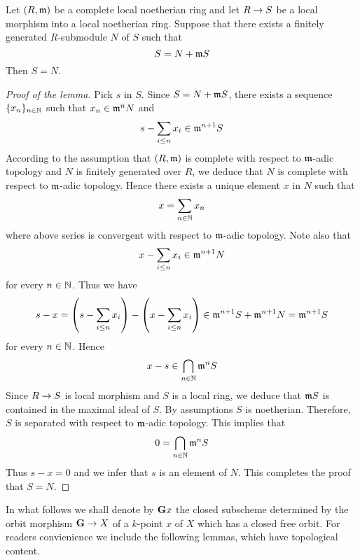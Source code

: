 \begin{lemma}\label{lemma:Hensels_lemma}
Let $(R,\mathfrak{m})$ be a complete local noetherian ring and let $R\rightarrow S$ be a local morphism into a local noetherian ring. Suppose that there exists a finitely generated $R$-submodule $N$ of $S$ such that
$$S = N + \mathfrak{m}S$$
Then $S = N$.
\end{lemma}
\begin{proof}[Proof of the lemma]
Pick $s$ in $S$. Since $S = N + \mathfrak{m}S$, there exists a sequence $\{x_n\}_{n\in {\mathbb N}}$ such that $x_n\in \mathfrak{m}^{n}N$ and 
$$s - \sum_{i\leq n}x_i \in \mathfrak{m}^{n+1}S$$
According to the assumption that $(R,\mathfrak{m})$ is complete with respect to $\mathfrak{m}$-adic topology and $N$ is finitely generated over $R$, we deduce that $N$ is complete with respect to $\mathfrak{m}$-adic topology. Hence there exists a unique element $x$ in $N$ such that
$$x = \sum_{n\in {\mathbb N}}x_n$$
where above series is convergent with respect to $\mathfrak{m}$-adic topology. Note also that
$$x - \sum_{i\leq n}x_i\in \mathfrak{m}^{n+1}N$$
for every $n\in {\mathbb N}$. Thus we have
$$s - x = \left(s - \sum_{i\leq n}x_i\right) - \left(x - \sum_{i\leq n}x_i\right) \in \mathfrak{m}^{n+1}S + \mathfrak{m}^{n+1}N = \mathfrak{m}^{n+1}S$$
for every $n\in {\mathbb N}$. Hence
$$x - s \in \bigcap_{n\in {\mathbb N}}\mathfrak{m}^nS$$
Since $R\rightarrow S$ is local morphism and $S$ is a local ring, we deduce that $\mathfrak{m}S$ is contained in the maximal ideal of $S$. By assumptions $S$ is noetherian. Therefore, $S$ is separated with respect to $\mathfrak{m}$-adic topology. This implies that
$$0 = \bigcap_{n\in {\mathbb N}}\mathfrak{m}^nS$$
Thus $s - x = 0$ and we infer that $s$ is an element of $N$. This completes the proof that $S = N$.
\end{proof}
\noindent
In what follows we shall denote by $\mathbf{G}x$ the closed subscheme determined by the orbit morphism $\mathbf{G}\rightarrow X$ of a $k$-point $x$ of $X$ which has a closed free orbit. For readers convienience we include the following lemmas, which have topological content.

